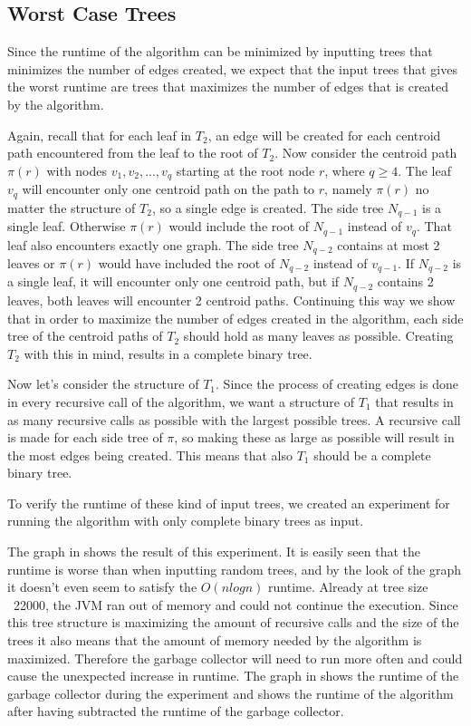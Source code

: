 
\subsection{Worst Case Trees}
Since the runtime of the algorithm can be minimized by inputting trees that minimizes the number of edges created, we expect that the input trees that gives the worst runtime are trees that maximizes the number of edges that is created by the algorithm.

Again, recall that for each leaf in $T_2$, an edge will be created for each centroid path encountered from the leaf to the root of $T_2$. Now consider the centroid path $\pi(r)$ with nodes $v_1, v_2, ..., v_q$ starting at the root node $r$, where $q \ge 4$. The leaf $v_q$ will encounter only one centroid path on the path to $r$, namely $\pi(r)$ no matter the structure of $T_2$, so a single edge is created. The side tree $N_{q-1}$ is a single leaf. Otherwise $\pi(r)$ would include the root of $N_{q-1}$ instead of $v_q$. That leaf also encounters exactly one graph. The side tree $N_{q-2}$ contains at most 2 leaves or $\pi(r)$ would have included the root of $N_{q-2}$ instead of $v_{q-1}$. If $N_{q-2}$ is a single leaf, it will encounter only one centroid path, but if $N_{q-2}$ contains 2 leaves, both leaves will encounter 2 centroid paths. Continuing this way we show that in order to maximize the number of edges created in the algorithm, each side tree of the centroid paths of $T_2$ should hold as many leaves as possible. Creating $T_2$ with this in mind, results in a complete binary tree.

Now let's consider the structure of $T_1$. Since the process of creating edges is done in every recursive call of the algorithm, we want a structure of $T_1$ that results in as many recursive calls as possible with the largest possible trees. A recursive call is made for each side tree of $\pi$, so making these as large as possible will result in the most edges being created. This means that also $T_1$ should be a complete binary tree.

To verify the runtime of these kind of input trees, we created an experiment for running the algorithm with only complete binary trees as input. 

The graph in  shows the result of this experiment.  It is easily seen that the runtime is worse than when inputting random trees, and by the look of the graph it doesn't even seem to satisfy the $O(nlogn)$ runtime. Already at tree size ~22000, the JVM ran out of memory and could not continue the execution. Since this tree structure is maximizing the amount of recursive calls and the size of the trees it also means that the amount of memory needed by the algorithm is maximized. Therefore the garbage collector will need to run more often and could cause the unexpected increase in runtime. The graph in  shows the runtime of the garbage collector during the experiment and  shows the runtime of the algorithm after having subtracted the runtime of the garbage collector. 

